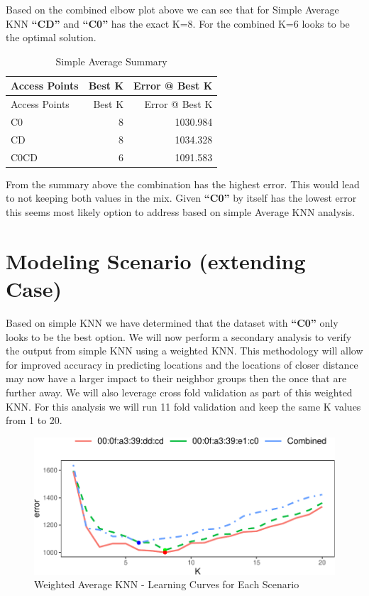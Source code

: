 \documentclass[
]{article}
\begin{document}
Based on the combined elbow plot above we can see that for Simple
Average KNN \textbf{``CD''} and \textbf{``C0''} has the exact K=8. For
the combined K=6 looks to be the optimal solution.

\begin{longtable}[]{@{}lrr@{}}
\caption{Simple Average Summary}\tabularnewline
\toprule
Access Points & Best K & Error @ Best K\tabularnewline
\midrule
\endfirsthead
\toprule
Access Points & Best K & Error @ Best K\tabularnewline
\midrule
\endhead
C0 & 8 & 1030.984\tabularnewline
CD & 8 & 1034.328\tabularnewline
C0CD & 6 & 1091.583\tabularnewline
\bottomrule
\end{longtable}

From the summary above the combination has the highest error. This would
lead to not keeping both values in the mix. Given \textbf{``C0''} by
itself has the lowest error this seems most likely option to address
based on simple Average KNN analysis.

\newpage

\hypertarget{modeling-scenario-extending-case}{%
\section{Modeling Scenario (extending
Case)}\label{modeling-scenario-extending-case}}

Based on simple KNN we have determined that the dataset with
\textbf{``C0''} only looks to be the best option. We will now perform a
secondary analysis to verify the output from simple KNN using a weighted
KNN. This methodology will allow for improved accuracy in predicting
locations and the locations of closer distance may now have a larger
impact to their neighbor groups then the once that are further away. We
will also leverage cross fold validation as part of this weighted KNN.
For this analysis we will run 11 fold validation and keep the same K
values from 1 to 20.

\begin{figure}[H]

{\centering \includegraphics{msds7333_case_study01_files/figure-latex/unnamed-chunk-11-1} 

}

\caption{Weighted Average KNN - Learning Curves for Each Scenario}\label{fig:unnamed-chunk-11}
\end{figure}
\end{document}
